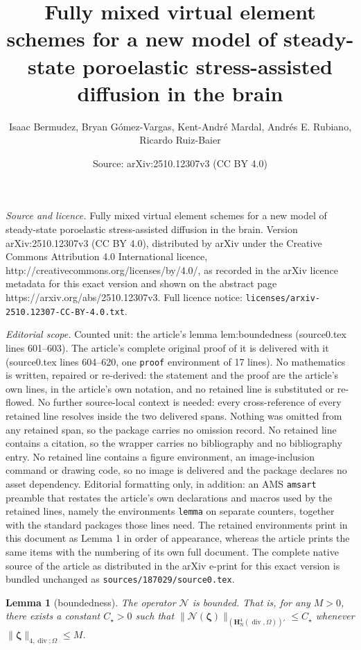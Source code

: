 \documentclass[10pt,a4paper]{amsart}
\title{Fully mixed virtual element schemes for a new model of steady-state poroelastic stress-assisted diffusion in the brain}
\author{Isaac Bermudez, Bryan G\'omez-Vargas, Kent-Andr\'e Mardal, Andr\'es E. Rubiano, Ricardo Ruiz-Baier}
\date{Source: arXiv:2510.12307v3 (CC BY 4.0)}
\newtheorem{lemma}{Lemma}
\newcommand\bH{\mathbf{H}}
\newcommand{\bzeta}{\boldsymbol{\zeta}}
\newcommand\cN{\mathcal{N}}
\newcommand\vdiv{\mathop{\mathrm{div}}\nolimits}
\begin{document}
\maketitle

\noindent\emph{Source and licence.} Fully mixed virtual element schemes for a new model of steady-state poroelastic stress-assisted diffusion in the brain. Version arXiv:2510.12307v3 (CC BY 4.0), distributed by arXiv under the Creative Commons Attribution 4.0 International licence, http://creativecommons.org/licenses/by/4.0/, as recorded in the arXiv licence metadata for this exact version and shown on the abstract page https://arxiv.org/abs/2510.12307v3. Full licence notice: \texttt{licenses/arxiv-2510.12307-CC-BY-4.0.txt}.\par\smallskip

\noindent\textit{Editorial scope.} Counted unit: the article's lemma lem:boundedness (source0.tex lines 601--603). The article's complete original proof of it is delivered with it (source0.tex lines 604--620, one \texttt{proof} environment of 17 lines). No mathematics is written, repaired or re-derived: the statement and the proof are the article's own lines, in the article's own notation, and no retained line is substituted or re-flowed.  No further source-local context is needed: every cross-reference of every retained line resolves inside the two delivered spans.  Nothing was omitted from any retained span, so the package carries no omission record.  No retained line contains a citation, so the wrapper carries no bibliography and no bibliography entry.  No retained line contains a figure environment, an image-inclusion command or drawing code, so no image is delivered and the package declares no asset dependency.  Editorial formatting only, in addition: an AMS \texttt{amsart} preamble that restates the article's own declarations and macros used by the retained lines, namely the environments \texttt{lemma} on separate counters, together with the standard packages those lines need.  The retained environments print in this document as Lemma 1 in order of appearance, whereas the article prints the same items with the numbering of its own full document.  The complete native source of the article as distributed in the arXiv e-print for this exact version is bundled unchanged as \texttt{sources/187029/source0.tex}.
\begin{lemma}[boundedness]\label{lem:boundedness}
    The operator $\cN$ is bounded. That is, for any $M > 0$, there exists a constant $C_\star > 0$ such that $\|\cN(\bzeta)\|_{(\bH^4_{\mathrm{N}}(\vdiv,\Omega))'} \le C_\star$ whenever $\|\bzeta\|_{{{4,\vdiv;\Omega}}} \le M$.
\end{lemma}
\end{document}
